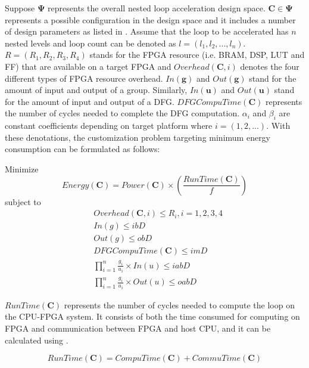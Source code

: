 Suppose $\bm{\Psi}$ represents the overall nested loop acceleration design 
space. $\bm{C} \in \bm{\Psi}$ represents a possible configuration in 
the design space and it includes a number of design parameters as  
listed in . Assume that the loop to be accelerated 
has $n$ nested levels and loop count can be denoted as $l=(l_1, l_2, ..., l_n)$.
$R=(R_1, R_2, R_3, R_4)$ stands for the FPGA resource (i.e. BRAM, DSP, LUT and FF) 
that are available on a target FPGA and $Overhead(\bm{C}, i)$ denotes the 
four different types of FPGA resource overhead. $In(\bm{g})$ and $Out(\bm{g})$ 
stand for the amount of input and output of a group. Similarly, $In(\bm{u})$ 
and $Out(\bm{u})$ stand for the amount of input and output of a DFG. 
$DFGCompuTime(\bm{C})$ represents the number of cycles needed to 
complete the DFG computation. $\alpha_i$ and $\beta_i$ are constant 
coefficients depending on target platform where $i=(1,2,...)$. With these denotations, 
the customization problem targeting minimum energy consumption can be formulated 
as follows:

Minimize 
\begin{equation} \label{eq:energy}
    Energy(\bm{C})=Power(\bm{C}) \times (\frac{RunTime(\bm{C})}{f})
\end{equation}
subject to
\begin{equation} \label{eq:constraints}
    \begin{split}
        &Overhead(\bm{C}, i) \leq R_i, i=1,2,3,4 \\
        &In(g) \leq ibD \\
        &Out(g) \leq obD \\
        &DFGCompuTime(\bm{C}) \leq imD \\
        &\displaystyle \prod_{i=1}^{n} \frac{g_i}{u_i} \times In(u) \leq iabD \\
        &\displaystyle \prod_{i=1}^{n} \frac{g_i}{u_i} \times Out(u) \leq oabD
    \end{split}
\end{equation}

$RunTime(\bm{C})$ represents the number of cycles needed to compute the loop on 
the CPU-FPGA system. It consists of both the time consumed for computing on FPGA and 
communication between FPGA and host CPU, and it can be calculated using .

\begin{equation} \label{eq:runtime}
    RunTime(\bm{C})=CompuTime(\bm{C})+CommuTime(\bm{C})
\end{equation}


